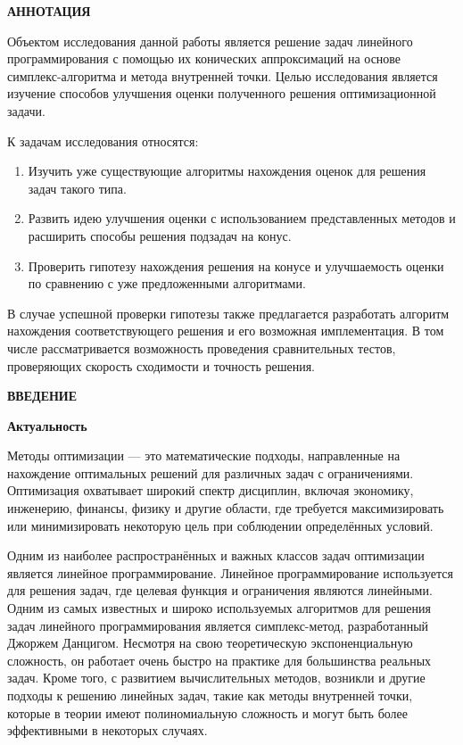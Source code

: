 \newpage
\begin{center}
  \textbf{\large АННОТАЦИЯ}
\end{center}


Объектом исследования данной работы является решение задач линейного программирования с помощью их конических аппроксимаций на основе симплекс-алгоритма и метода внутренней точки. Целью исследования является изучение способов улучшения оценки полученного решения оптимизационной задачи.

К задачам исследования относятся:
\begin{enumerate}
  \item Изучить уже существующие алгоритмы нахождения оценок для решения задач такого типа.
  \item Развить идею улучшения оценки с использованием представленных методов и расширить способы решения подзадач на конус.
  \item Проверить гипотезу нахождения решения на конусе и улучшаемость оценки по сравнению с уже предложенными алгоритмами.
\end{enumerate}

В случае успешной проверки гипотезы также предлагается разработать алгоритм нахождения соответствующего решения и его возможная имплементация. В том числе рассматривается возможность проведения сравнительных тестов, проверяющих скорость сходимости и точность решения.

\onehalfspacing
\setcounter{page}{2}

\newpage
\renewcommand{\contentsname}{\centerline{\large СОДЕРЖАНИЕ}}
\tableofcontents

\newpage
\begin{center}
  \textbf{\large ВВЕДЕНИЕ}
\end{center}


\textbf{Актуальность}

Методы оптимизации — это математические подходы, направленные на нахождение оптимальных решений для различных задач с ограничениями. Оптимизация охватывает широкий спектр дисциплин, включая экономику, инженерию, финансы, физику и другие области, где требуется максимизировать или минимизировать некоторую цель при соблюдении определённых условий.

Одним из наиболее распространённых и важных классов задач оптимизации является линейное программирование. Линейное программирование используется для решения задач, где целевая функция и ограничения являются линейными. Одним из самых известных и широко используемых алгоритмов для решения задач линейного программирования является симплекс-метод, разработанный Джоржем Данцигом. Несмотря на свою теоретическую экспоненциальную сложность, он работает очень быстро на практике для большинства реальных задач. Кроме того, с развитием вычислительных методов, возникли и другие подходы к решению линейных задач, такие как методы внутренней точки, которые в теории имеют полиномиальную сложность и могут быть более эффективными в некоторых случаях.


